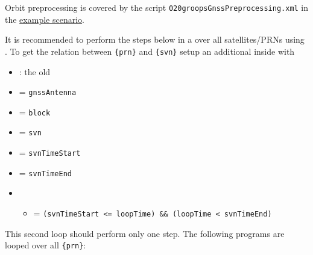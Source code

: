 Orbit preprocessing is covered by the script \verb|020groopsGnssPreprocessing.xml| in the \href{https://ftp.tugraz.at/outgoing/ITSG/groops/scenario/scenarioGnssNetwork.zip}{example scenario}.

It is recommended to perform the steps below in a  over all
satellites/PRNs using . To get the relation between \verb|{prn}| and \verb|{svn}| setup
an additional  inside
 with
\begin{itemize}
  \item {}: the old 
  \item {}         = \verb|gnssAntenna|
  \item {}      = \verb|block|
  \item {}    = \verb|svn|
  \item {} = \verb|svnTimeStart|
  \item {}   = \verb|svnTimeEnd|
  \item {}
  \begin{itemize}
    \item {} = \verb|(svnTimeStart <= loopTime) && (loopTime < svnTimeEnd)|
  \end{itemize}
\end{itemize}
This second loop should perform only one step. The following programs are looped over all \verb|{prn}|:
